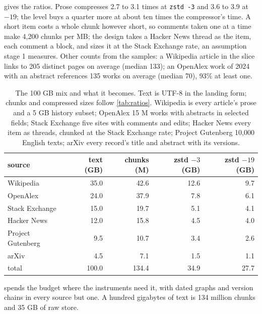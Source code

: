 \documentclass[11pt]{article}
\theoremstyle{plain}
\theoremstyle{definition}
\theoremstyle{remark}
\newcommand{\code}[1]{\texttt{#1}}
\begin{document}
 gives the ratios. Prose compresses 2.7 to 3.1 times at \code{zstd -3} and 3.6 to
3.9 at $-19$; the level buys a quarter more at about ten times the compressor's time. A short item
costs a whole chunk however short, so comments taken one at a time make 4,200 chunks per MB; the
design takes a Hacker News thread as the item, each comment a block, and sizes it at the Stack
Exchange rate, an assumption stage 1 measures. Other counts from the samples: a Wikipedia article in
the slice links to 205 distinct pages on average (median 133); an OpenAlex work of 2024 with an
abstract references 135 works on average (median 70), 93\% at least one.

\begin{table}[t]
\centering
\caption{The 100 GB mix and what it becomes. Text is UTF-8 in the landing form; chunks and
compressed sizes follow \cref{tab:ratios}. Wikipedia is every article's prose and a 5 GB history
subset; OpenAlex 15 M works with abstracts in selected fields; Stack Exchange five sites with
comments and edits; Hacker News every item as threads, chunked at the Stack Exchange rate; Project
Gutenberg 10,000 English texts; arXiv every record's title and abstract with its versions.}\label{tab:mix}
\small
\begin{tabular}{lrrrr}
\toprule
source & text (GB) & chunks (M) & zstd $-3$ (GB) & zstd $-19$ (GB) \\
\midrule
Wikipedia & 35.0 & 42.6 & 12.6 & 9.7 \\
OpenAlex & 24.0 & 37.9 & 7.8 & 6.1 \\
Stack Exchange & 15.0 & 19.7 & 5.1 & 4.1 \\
Hacker News & 12.0 & 15.8 & 4.5 & 4.0 \\
Project Gutenberg & 9.5 & 10.7 & 3.4 & 2.6 \\
arXiv & 4.5 & 7.1 & 1.5 & 1.1 \\
\midrule
total & 100.0 & 134.4 & 34.9 & 27.7 \\
\bottomrule
\end{tabular}
\end{table}

 spends the budget where the instruments need it, with dated graphs and version
chains in every source but one. A hundred gigabytes of text is 134 million chunks and 35 GB of raw
store.
\end{document}
